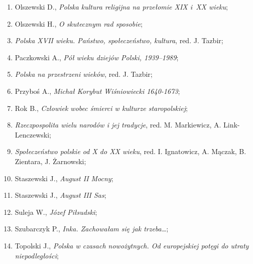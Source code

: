 \documentclass[a4paper,11pt]{article}
\begin{document}
\begin{enumerate}
\item Olszewski D., \textit{Polska kultura religijna na przełomie XIX
    i~XX wieku};



\item Olszewski H., \textit{O skutecznym rad sposobie};



\item \textit{Polska XVII wieku. Państwo, społeczeństwo, kultura}, red.
  J. Tazbir;



\item Paczkowski A., \textit{Pół wieku dziejów Polski, 1939--1989};



\item \textit{Polska na przestrzeni wieków}, red. J. Tazbir;



\item Przyboś A., \textit{Michał Korybut Wiśniowiecki 1640-1673};



\item Rok B., \textit{Człowiek wobec śmierci w kulturze staropolskiej};



\item \textit{Rzeczpospolita wielu narodów i jej tradycje}, red. M.
  Markiewicz, A. Link-Lenczewski;



\item \textit{Społeczeństwo polskie od X do XX wieku}, red. I.
  Ignatowicz, A. Mączak, B. Zientara, J. Żarnowski;



\item Staszewski J., \textit{August II Mocny};



\item Staszewski J., \textit{August III Sas};



\item Suleja W., \textit{Józef Piłsudski};



\item Szubarczyk P., \textit{Inka. Zachowałam się jak trzeba\ldots};



\item Topolski J., \textit{Polska w czasach nowożytnych. Od europejskiej
    potęgi do utraty niepodległości};




\end{enumerate}
\end{document}
